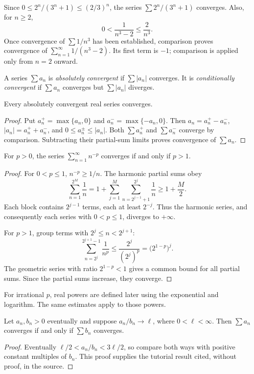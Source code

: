 \begin{example}
Since $0\leq2^n/(3^n+1)\leq(2/3)^n$, the series
$\sum 2^n/(3^n+1)$ converges. Also, for $n\geq2$,
\[
0<\frac1{n^3-2}\leq\frac2{n^3}.
\]
Once convergence of $\sum1/n^3$ has been established, comparison proves
convergence of $\sum_{n=1}^{\infty}1/(n^3-2)$. Its first term is $-1$;
comparison is applied only from $n=2$ onward.
\end{example}

\begin{definition}
A series $\sum a_n$ is \emph{absolutely convergent} if $\sum|a_n|$ converges.
It is \emph{conditionally convergent} if $\sum a_n$ converges but
$\sum|a_n|$ diverges.
\end{definition}

\begin{theorem}
Every absolutely convergent real series converges.
\end{theorem}
\begin{proof}
Put $a_n^+=\max\{a_n,0\}$ and $a_n^-=\max\{-a_n,0\}$.
Then $a_n=a_n^+-a_n^-$, $|a_n|=a_n^++a_n^-$, and
$0\leq a_n^\pm\leq|a_n|$. Both $\sum a_n^+$ and $\sum a_n^-$ converge
by comparison. Subtracting their partial-sum limits proves convergence
of $\sum a_n$.
\end{proof}

\begin{theorem}[$p$-series]
For $p>0$, the series $\sum_{n=1}^{\infty}n^{-p}$ converges if and only
if $p>1$.
\end{theorem}
\begin{proof}
For $0<p\leq1$, $n^{-p}\geq1/n$. The harmonic partial sums obey
\[
\sum_{n=1}^{2^M}\frac1n
=1+\sum_{j=1}^M\sum_{n=2^{j-1}+1}^{2^j}\frac1n
\geq1+\frac M2.
\]
Each block contains $2^{j-1}$ terms, each at least $2^{-j}$.
Thus the harmonic series, and consequently each series with $0<p\leq1$,
diverges to $+\infty$.

For $p>1$, group terms with $2^j\leq n<2^{j+1}$:
\[
\sum_{n=2^j}^{2^{j+1}-1}\frac1{n^p}
\leq\frac{2^j}{(2^j)^p}=\bigl(2^{1-p}\bigr)^j.
\]
The geometric series with ratio $2^{1-p}<1$ gives a common bound for all
partial sums. Since the partial sums increase, they converge.
\end{proof}
For irrational $p$, real powers are defined later using the exponential
and logarithm. The same estimates apply to those powers.

\begin{theorem}
Let $a_n,b_n>0$ eventually and suppose $a_n/b_n\to\ell$, where
$0<\ell<\infty$. Then $\sum a_n$ converges if and only if $\sum b_n$
converges.
\end{theorem}
\begin{proof}
Eventually $\ell/2<a_n/b_n<3\ell/2$, so compare both ways with positive
constant multiples of $b_n$. This proof supplies the tutorial result
cited, without proof, in the source.
\end{proof}

